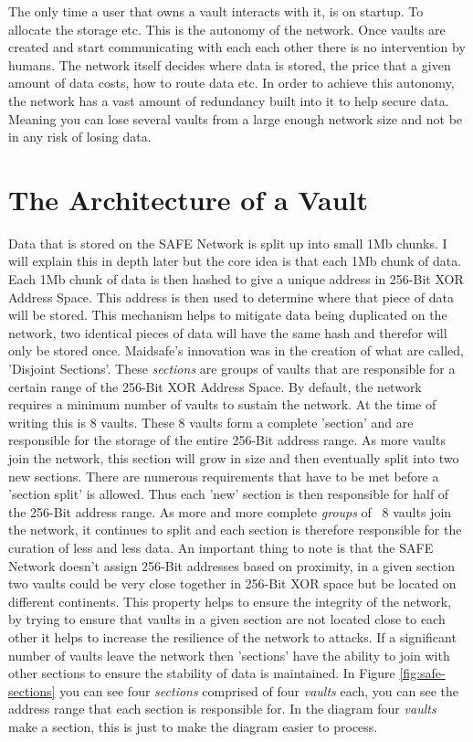 The only time a user that owns a vault interacts with it, is on startup. To allocate the storage etc. This is the autonomy of the network. Once vaults are created and start communicating with each each other there is no intervention by humans. The network itself decides where data is stored, the price that a given amount of data costs, how to route data etc. In order to achieve this autonomy, the network has a vast amount of redundancy built into it to help secure data. Meaning you can lose several vaults from a large enough network size and not be in any risk of losing data.

\section{The Architecture of a Vault}

Data that is stored on the SAFE Network is split up into small 1Mb chunks. I will explain this in depth later but the core idea is that each 1Mb chunk of data. Each 1Mb chunk of data is then hashed to give a unique address in 256-Bit XOR Address Space. This address is then used to determine where that piece of data will be stored. This mechanism helps to mitigate data being duplicated on the network, two identical pieces of data will have the same hash and therefor will only be stored once. Maidsafe's innovation was in the creation of what are called, 'Disjoint Sections'. These \textit{sections} are groups of vaults that are responsible for a certain range of the 256-Bit XOR Address Space. By default, the network requires a minimum number of vaults to sustain the network. At the time of writing this is 8 vaults. These 8 vaults form a complete 'section' and are responsible for the storage of the entire 256-Bit address range. As more vaults join the network, this section will grow in size and then eventually split into two new sections. There are numerous requirements that have to be met before a 'section split' is allowed. Thus each 'new' section is then responsible for half of the 256-Bit address range. As more and more complete \textit{groups} of ~8 vaults join the network, it continues to split and each section is therefore responsible for the curation of less and less data. An important thing to note is that the SAFE Network doesn't assign 256-Bit addresses based on proximity, in a given section two vaults could be very close together in 256-Bit XOR space but be located on different continents. This property helps to ensure the integrity of the network, by trying to ensure that vaults in a given section are not located close to each other it helps to increase the resilience of the network to attacks. If a significant number of vaults leave the network then 'sections' have the ability to join with other sections to ensure the stability of data is maintained. In Figure \ref{fig:safe-sections} you can see four \textit{sections} comprised of four \textit{vaults} each, you can see the address range that each section is responsible for. In the diagram four \textit{vaults} make a section, this is just to make the diagram easier to process.

